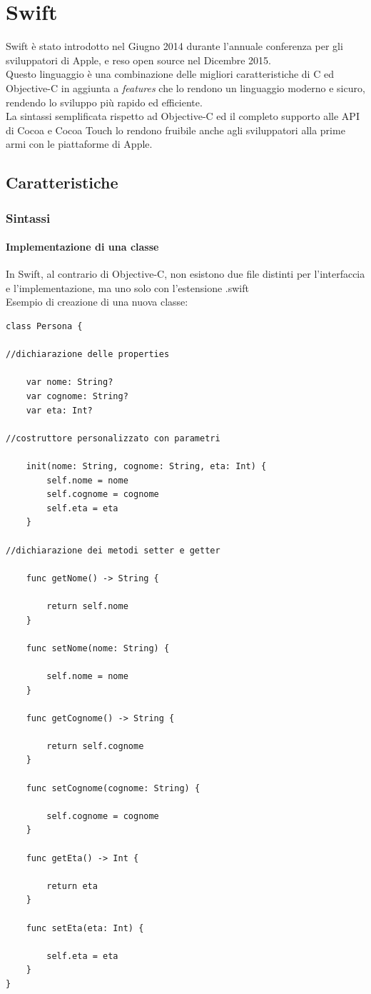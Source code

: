 \chapter{Swift}
Swift è stato introdotto nel Giugno 2014 durante l'annuale conferenza per gli sviluppatori di Apple, e reso open source nel Dicembre 2015.\\
Questo linguaggio è una combinazione delle migliori caratteristiche di C ed Objective-C in aggiunta a \textit{features} che lo rendono un linguaggio moderno e sicuro, rendendo lo sviluppo più rapido ed efficiente.\\La sintassi semplificata rispetto ad Objective-C ed il completo supporto alle API di Cocoa e Cocoa Touch lo rendono fruibile anche agli sviluppatori alla prime armi con le piattaforme di Apple.
\section{Caratteristiche}
\subsection{Sintassi}
\subsubsection{Implementazione di una classe}
In Swift, al contrario di Objective-C, non esistono due file distinti per l'interfaccia e l'implementazione, ma uno solo con l'estensione .swift\\
Esempio di creazione di una nuova classe:\\
\lstset{language=[Objective]C, breakindent=40pt, breaklines}
\begin{lstlisting}
class Persona { 

//dichiarazione delle properties

	var nome: String? 
	var cognome: String? 
	var eta: Int?

//costruttore personalizzato con parametri 

	init(nome: String, cognome: String, eta: Int) {
		self.nome = nome
		self.cognome = cognome
		self.eta = eta
	}

//dichiarazione dei metodi setter e getter 

	func getNome() -> String {

		return self.nome
	}

	func setNome(nome: String) {

		self.nome = nome
	}

	func getCognome() -> String {

		return self.cognome
	}

	func setCognome(cognome: String) {
	
		self.cognome = cognome
	}

	func getEta() -> Int {
	
		return eta
	}

	func setEta(eta: Int) {

		self.eta = eta
	}
}
\end{lstlisting}
